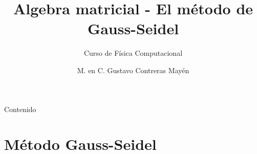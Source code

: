 


\normalfont
\usepackage{ccfonts}%
\usepackage[T1]{fontenc}%
\renewcommand{\rmdefault}{cmr}%
\linespread{1.3}
\title{Algebra matricial - El método de Gauss-Seidel}
\subtitle{Curso de Física Computacional}
\author[]{M. en C. Gustavo Contreras Mayén}
\newcommand{\seti}{\setcounter{saveenumi}{\value{enumi}}}
\newcommand{\conti}{\setcounter{enumi}{\value{saveenumi}}}

\newcommand{\localtextbulletone}{\textcolor{gray}{\raisebox{.45ex}{\rule{.6ex}{.6ex}}}}
\maketitle
\fontsize{14}{14}\selectfont
{}
\begin{frame}{Contenido}
\tableofcontents[pausesections]
\end{frame}
\section{Método Gauss-Seidel}

